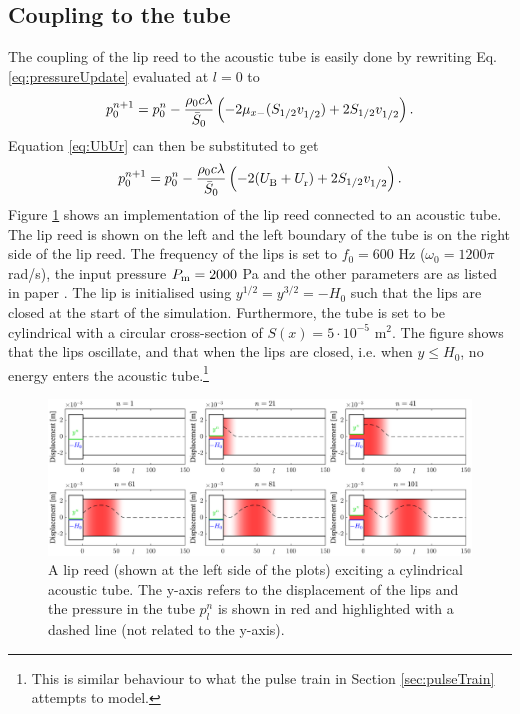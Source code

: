 \subsection{Coupling to the tube}\label{sec:lipreedTube}
The coupling of the lip reed to the acoustic tube is easily done by rewriting Eq. \eqref{eq:pressureUpdate} evaluated at $l=0$ to
\begin{equation}\label{eq:tubeCoupling}
    p^{n+1}_0 = p_0^n - \frac{\rho_0c\lambda}{\bar S_0}\left(-2\mu_{x-}(S_{1/2}v_{1/2}^{}) + 2 S_{1/2}v_{1/2}^{}\right).
\end{equation}
Equation \eqref{eq:UbUr} can then be substituted to get
\begin{equation}\label{eq:pressureCoupled}
    p^{n+1}_0 = p_0^n - \frac{\rho_0c\lambda}{\bar S_0}\left(-2(U_\text{B}^{} + U_\text{r}^{}) + 2 S_{1/2}v_{1/2}^{}\right).
\end{equation}
Figure \ref{fig:lipreedTube} shows an implementation of the lip reed connected to an acoustic tube. The lip reed is shown on the left and the left boundary of the tube is on the right side of the lip reed. The frequency of the lips is set to $f_0 = 600$ Hz ($\omega_0 = 1200\pi$ rad/s), the input pressure $P_{\text{m}} = 2000$ Pa and the other parameters are as listed in paper \citeP[H]. The lip is initialised using $y^{1/2} = y^{3/2} = -H_0$ such that the lips are closed at the start of the simulation. Furthermore, the tube is set to be cylindrical with a circular cross-section of $S(x) = 5\cdot 10^{-5}$ m$^2$. The figure shows that the lips oscillate, and that when the lips are closed, i.e. when $y \leq H_0$, no energy enters the acoustic tube.\footnote{This is similar behaviour to what the pulse train in Section \ref{sec:pulseTrain} attempts to model.}


\begin{figure}[h]
    \centering
    \includegraphics[width=\textwidth]{figures/exciters/lipreed/lipreedImplementation.eps}
    \caption{A lip reed (shown at the left side of the plots) exciting a cylindrical acoustic tube. The y-axis refers to the displacement of the lips and the pressure in the tube $p_l^n$ is shown in red and highlighted with a dashed line (not related to the y-axis).\label{fig:lipreedTube}}
\end{figure}
